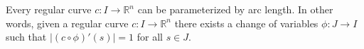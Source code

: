 Every regular curve $c: I \rightarrow \mathbb{R}^n$ can be parameterized by arc length. In other words, given a regular curve $c: I \rightarrow \mathbb{R}^n$ there exists a change of variables $\phi: J \rightarrow I$ such that $|(c \circ \phi)'(s)| = 1$ for all $s \in J$.
